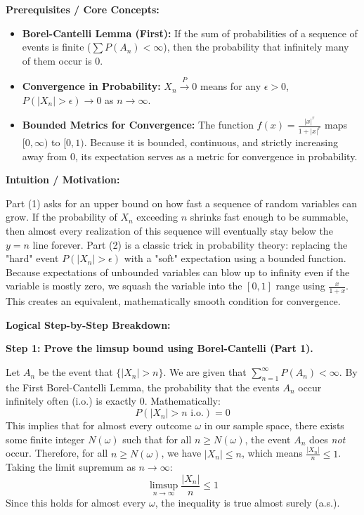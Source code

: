 \begin{solution}
\textbf{Prerequisites / Core Concepts:}
\begin{itemize}
    \item \textbf{Borel-Cantelli Lemma (First):} If the sum of probabilities of a sequence of events is finite ($\sum P(A_n) < \infty$), then the probability that infinitely many of them occur is 0.
    \item \textbf{Convergence in Probability:} $X_n \xrightarrow{P} 0$ means for any $\epsilon > 0$, $P(|X_n| > \epsilon) \to 0$ as $n \to \infty$.
    \item \textbf{Bounded Metrics for Convergence:} The function $f(x) = \frac{|x|^r}{1+|x|^r}$ maps $[0, \infty)$ to $[0, 1)$. Because it is bounded, continuous, and strictly increasing away from 0, its expectation serves as a metric for convergence in probability.
\end{itemize}

\textbf{Intuition / Motivation:}

Part (1) asks for an upper bound on how fast a sequence of random variables can grow. If the probability of $X_n$ exceeding $n$ shrinks fast enough to be summable, then almost every realization of this sequence will eventually stay below the $y=n$ line forever.
Part (2) is a classic trick in probability theory: replacing the "hard" event $P(|X_n|>\epsilon)$ with a "soft" expectation using a bounded function. Because expectations of unbounded variables can blow up to infinity even if the variable is mostly zero, we squash the variable into the $[0,1]$ range using $\frac{x}{1+x}$. This creates an equivalent, mathematically smooth condition for convergence.

\textbf{Logical Step-by-Step Breakdown:}

\textbf{Step 1: Prove the limsup bound using Borel-Cantelli (Part 1).}

Let $A_n$ be the event that $\{|X_n| > n\}$.
We are given that $\sum_{n=1}^\infty P(A_n) < \infty$.
By the First Borel-Cantelli Lemma, the probability that the events $A_n$ occur infinitely often (i.o.) is exactly 0. Mathematically:
\[ P(|X_n| > n \text{ i.o.}) = 0 \]
This implies that for almost every outcome $\omega$ in our sample space, there exists some finite integer $N(\omega)$ such that for all $n \geq N(\omega)$, the event $A_n$ does \textit{not} occur.
Therefore, for all $n \geq N(\omega)$, we have $|X_n| \leq n$, which means $\frac{|X_n|}{n} \leq 1$.
Taking the limit supremum as $n \to \infty$:
\[ \limsup_{n\to\infty} \frac{|X_n|}{n} \leq 1 \]
Since this holds for almost every $\omega$, the inequality is true almost surely (a.s.).


\end{solution}

